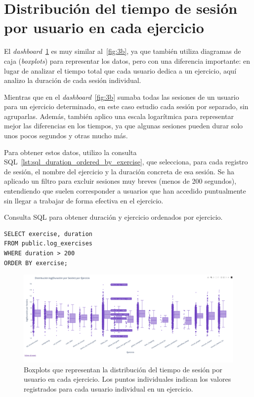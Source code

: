 \documentclass[a4paper, 12pt]{book}
\begin{document}
\section{Distribución del tiempo de sesión por usuario en cada ejercicio}
\label{sec:dash3c}

El \textit{dashboard}~\ref{fig:3c} es muy similar al~\ref{fig:3b}, ya que también utiliza diagramas de caja (\textit{boxplots}) para representar los datos, pero con una diferencia importante: en lugar de analizar el tiempo total que cada usuario dedica a un ejercicio, aquí analizo la duración de cada sesión individual.

Mientras que en el \textit{dashboard}~\ref{fig:3b} sumaba todas las sesiones de un usuario para un ejercicio determinado, en este caso estudio cada sesión por separado, sin agruparlas. Además, también aplico una escala logarítmica para representar mejor las diferencias en los tiempos, ya que algunas sesiones pueden durar solo unos pocos segundos y otras mucho más.

Para obtener estos datos, utilizo la consulta SQL~\ref{lst:sql_duration_ordered_by_exercise}, que selecciona, para cada registro de sesión, el nombre del ejercicio y la duración concreta de esa sesión. Se ha aplicado un filtro para excluir sesiones muy breves (menos de 200 segundos), entendiendo que suelen corresponder a usuarios que han accedido puntualmente sin llegar a trabajar de forma efectiva en el ejercicio.

\begin{listing}[h!]
\caption{Consulta SQL para obtener duración y ejercicio ordenados por ejercicio.}
\label{lst:sql_duration_ordered_by_exercise}
\begin{verbatim}
SELECT exercise, duration
FROM public.log_exercises
WHERE duration > 200
ORDER BY exercise;
\end{verbatim}
\end{listing}


\begin{figure}[H]
  \centering
  \includegraphics[width=1.1\textwidth]{img/3c.png}
  \caption{Boxplots que representan la distribución del tiempo de sesión por usuario en cada ejercicio. Los puntos individuales indican los valores registrados para cada usuario individual en un ejercicio.}
  \label{fig:3c}
\end{figure}
\end{document}
